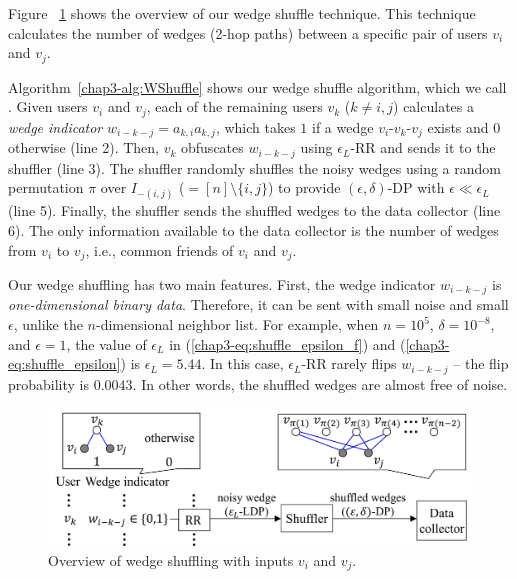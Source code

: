 Figure ~\ref{chap3-fig:wedge_shuffle} shows the overview of our wedge shuffle technique. 
This technique calculates the number of wedges (2-hop paths) between 
a specific pair of users $v_i$ and $v_j$. 

Algorithm~\ref{chap3-alg:WShuffle} shows our wedge shuffle algorithm, which we call \AlgWS{}. 
Given users $v_i$ and $v_j$, 
each of the remaining users $v_k$ ($k \ne i, j$) 
calculates a \textit{wedge indicator} $w_{i-k-j} = a_{k,i} a_{k,j}$, 
which 
takes $1$ if 
a wedge $v_i$-$v_k$-$v_j$ exists and $0$ otherwise (line 2). 
Then, $v_k$ obfuscates $w_{i-k-j}$ using $\epsilon_L$-RR and sends it to the shuffler (line 3). 
The shuffler randomly shuffles the noisy wedges using a random permutation $\pi$ over 
$I_{-(i,j)}$ ($=[n]\setminus\{i,j\}$) 
to provide $(\epsilon, \delta)$-DP with $\epsilon \ll \epsilon_L$ (line 5). 
Finally, the shuffler sends the shuffled wedges to the data collector (line 6). 
The only information available to the data collector is  the number of wedges from $v_i$ to $v_j$, i.e., 
common friends of $v_i$ and $v_j$. 

Our wedge shuffling has two main features. 
First, 
the wedge indicator $w_{i-k-j}$ is \textit{one-dimensional binary data}. 
Therefore, it can be sent with small noise and small $\epsilon$, unlike the $n$-dimensional neighbor list. 
For example, when $n=10^5$, $\delta=10^{-8}$, and $\epsilon=1$, the value of $\epsilon_L$ in (\ref{chap3-eq:shuffle_epsilon_f}) and (\ref{chap3-eq:shuffle_epsilon}) is $\epsilon_L = 5.44$. In this case, $\epsilon_L$-RR rarely flips $w_{i-k-j}$ -- the flip probability is $0.0043$. 
In other words, the shuffled wedges are almost free of noise. 

\begin{figure}[t]
  \centering
  \includegraphics[width=0.99\linewidth]{fig/wedge_shuffle.pdf}
  
  \caption{Overview of wedge shuffling with inputs $v_i$ and $v_j$. 
  }
  \label{chap3-fig:wedge_shuffle}
\end{figure}

